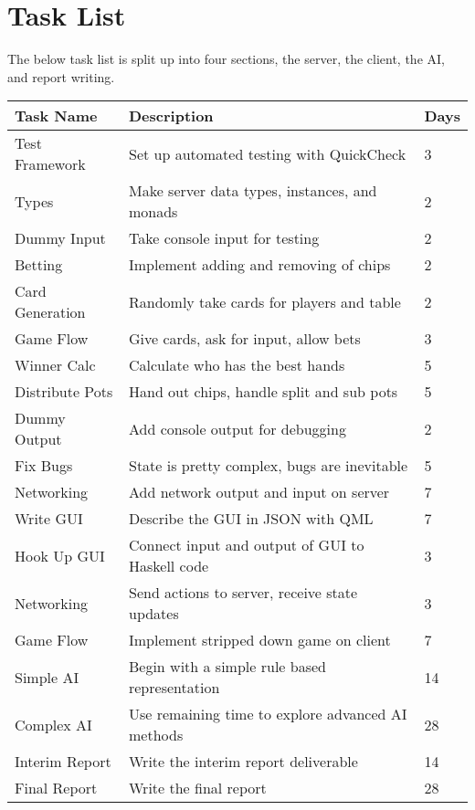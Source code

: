 \section{Task List}
The below task list is split up into four sections, the server, the client, the AI, and report writing.

\begin{center}
    \begin{tabular}{l l l}
    \toprule
    Task Name       & Description                                       & Days  \\
    \midrule
    Test Framework  & Set up automated testing with QuickCheck          & 3     \\ \addlinespace
    Types           & Make server data types, instances, and monads     & 2     \\ \addlinespace
    Dummy Input     & Take console input for testing                    & 2     \\ \addlinespace
    Betting         & Implement adding and removing of chips            & 2     \\ \addlinespace
    Card Generation & Randomly take cards for players and table         & 2     \\ \addlinespace
    Game Flow       & Give cards, ask for input, allow bets             & 3     \\ \addlinespace
    Winner Calc     & Calculate who has the best hands                  & 5     \\ \addlinespace
    Distribute Pots & Hand out chips, handle split and sub pots         & 5     \\ \addlinespace
    Dummy Output    & Add console output for debugging                  & 2     \\ \addlinespace
    Fix Bugs        & State is pretty complex, bugs are inevitable      & 5     \\ \addlinespace
    Networking      & Add network output and input on server            & 7     \\ \addlinespace
    \midrule
    Write GUI       & Describe the GUI in JSON with QML                 & 7     \\ \addlinespace
    Hook Up GUI     & Connect input and output of GUI to Haskell code   & 3     \\ \addlinespace
    Networking      & Send actions to server, receive state updates     & 3     \\ \addlinespace
    Game Flow       & Implement stripped down game on client            & 7     \\ \addlinespace
    \midrule
    Simple AI       & Begin with a simple rule based representation     & 14    \\ \addlinespace
    Complex AI      & Use remaining time to explore advanced AI methods & 28    \\ \addlinespace
    \midrule
    Interim Report  & Write the interim report deliverable              & 14    \\ \addlinespace
    Final Report    & Write the final report                            & 28    \\
    \bottomrule
    \end{tabular}
\end{center}
